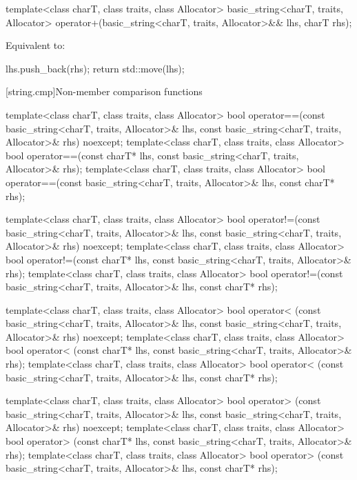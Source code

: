 %
\begin{itemdecl}
template<class charT, class traits, class Allocator>
  basic_string<charT, traits, Allocator>
    operator+(basic_string<charT, traits, Allocator>&& lhs, charT rhs);
\end{itemdecl}

\begin{itemdescr}
\pnum
\effects
Equivalent to:
\begin{codeblock}
lhs.push_back(rhs);
return std::move(lhs);
\end{codeblock}
\end{itemdescr}

[string.cmp]{Non-member comparison functions}
\begin{itemdecl}
template<class charT, class traits, class Allocator>
  bool operator==(const basic_string<charT, traits, Allocator>& lhs,
                  const basic_string<charT, traits, Allocator>& rhs) noexcept;
template<class charT, class traits, class Allocator>
  bool operator==(const charT* lhs, const basic_string<charT, traits, Allocator>& rhs);
template<class charT, class traits, class Allocator>
  bool operator==(const basic_string<charT, traits, Allocator>& lhs, const charT* rhs);

template<class charT, class traits, class Allocator>
  bool operator!=(const basic_string<charT, traits, Allocator>& lhs,
                  const basic_string<charT, traits, Allocator>& rhs) noexcept;
template<class charT, class traits, class Allocator>
  bool operator!=(const charT* lhs, const basic_string<charT, traits, Allocator>& rhs);
template<class charT, class traits, class Allocator>
  bool operator!=(const basic_string<charT, traits, Allocator>& lhs, const charT* rhs);

template<class charT, class traits, class Allocator>
  bool operator< (const basic_string<charT, traits, Allocator>& lhs,
                  const basic_string<charT, traits, Allocator>& rhs) noexcept;
template<class charT, class traits, class Allocator>
  bool operator< (const charT* lhs, const basic_string<charT, traits, Allocator>& rhs);
template<class charT, class traits, class Allocator>
  bool operator< (const basic_string<charT, traits, Allocator>& lhs, const charT* rhs);

template<class charT, class traits, class Allocator>
  bool operator> (const basic_string<charT, traits, Allocator>& lhs,
                  const basic_string<charT, traits, Allocator>& rhs) noexcept;
template<class charT, class traits, class Allocator>
  bool operator> (const charT* lhs, const basic_string<charT, traits, Allocator>& rhs);
template<class charT, class traits, class Allocator>
  bool operator> (const basic_string<charT, traits, Allocator>& lhs, const charT* rhs);


\end{itemdecl}
